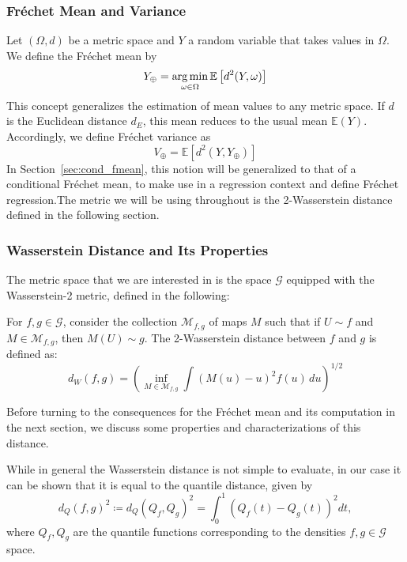 \subsubsection{Fréchet Mean and Variance}
\label{sec:f_mean}
Let $(\Omega, d)$ be a metric space and $Y$ a random variable that takes values in
$\Omega$. We define the Fréchet mean by
\begin{equation}
    Y_\oplus = \operatorname*{arg\,min}_{\omega \in \Omega} \mathbb{E} \left[ d^2(Y, \omega) \right]
    \label{eq:fmean}
\end{equation}
This concept generalizes the estimation of mean values to any metric space. If $d$ is
the Euclidean distance $d_E$, this mean reduces to the usual mean $\mathbb{E}(Y)$. Accordingly,
we define Fréchet variance as
\begin{equation}
    V_\oplus = \mathbb{E} \left[ d^2(Y, Y_\oplus) \right]
    \label{eq:fvar}
\end{equation}
In Section~\ref{sec:cond_fmean}, this notion will be generalized to that of a conditional
Fréchet mean, to make use in a regression context and define Fréchet regression.The metric
we will be using throughout is the 2-Wasserstein distance defined in the following section.

\subsubsection{Wasserstein Distance and Its Properties}
\label{sec:wasserstein_distance}
The metric space that we are interested in is the space $\mathcal{G}$ equipped with the
Wasserstein-2 metric, defined in the following:
\begin{definition}
    \label{def:wasserstein_2_dist}
    For \( f, g \in \mathcal{G} \), consider the collection \( \mathcal{M}_{f,g} \) of maps \( M \)
    such that if \( U \sim f \) and \( M \in \mathcal{M}_{f,g} \), then \( M(U) \sim g \).
    The 2-Wasserstein distance between \( f \) and \( g \) is defined as:
    \[
    d_W(f, g) = \left( \inf_{M \in \mathcal{M}_{f,g}} \int (M(u) - u)^2 f(u) \, du \right)^{1/2}
    \]
\end{definition}
Before turning to the consequences for the Fréchet mean and its computation in the next section,
we discuss some properties and characterizations of this distance.

While in general the Wasserstein distance is not simple to evaluate, in our case it can
be shown that it is equal to the quantile distance, given by
\[
d_Q(f, g)^2 \coloneqq d_Q(Q_f, Q_g)^2 = \int_{0}^{1} (Q_f(t) - Q_g(t))^2 dt,
\]
where $Q_f, Q_g$ are the quantile functions corresponding to the densities $f, g \in \mathcal{G}$ space.


